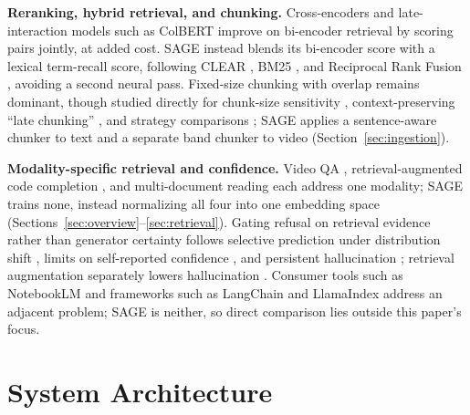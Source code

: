 \documentclass[conference]{IEEEtran}
\begin{document}
\textbf{Reranking, hybrid retrieval, and chunking.} Cross-encoders \cite{nogueira2019bert} and late-interaction models such as ColBERT \cite{khattab2020colbert} improve on bi-encoder retrieval by scoring pairs jointly, at added cost. SAGE instead blends its bi-encoder score with a lexical term-recall score, following CLEAR \cite{gao2020clear}, BM25 \cite{robertson2009bm25}, and Reciprocal Rank Fusion \cite{cormack2009rrf}, avoiding a second neural pass. Fixed-size chunking with overlap remains dominant, though studied directly for chunk-size sensitivity \cite{jimenoyepes2024chunking}, context-preserving ``late chunking'' \cite{gunther2024latechunking}, and strategy comparisons \cite{merola2025chunking}; SAGE applies a sentence-aware chunker to text and a separate band chunker to video (Section~\ref{sec:ingestion}).

\textbf{Modality-specific retrieval and confidence.} Video QA \cite{lei2018tvqa,zhang2024llovi}, retrieval-augmented code completion \cite{husain2019codesearchnet,zhang2023repocoder,wu2024repoformer}, and multi-document reading \cite{sachan2021multidoc} each address one modality; SAGE trains none, instead normalizing all four into one embedding space (Sections~\ref{sec:overview}--\ref{sec:retrieval}). Gating refusal on retrieval evidence rather than generator certainty follows selective prediction under distribution shift \cite{kamath2020selective}, limits on self-reported confidence \cite{kadavath2022knowwhattheyknow}, and persistent hallucination \cite{ji2023hallucination}; retrieval augmentation separately lowers hallucination \cite{shuster2021retrieval}. Consumer tools such as NotebookLM \cite{notebooklm2023} and frameworks such as LangChain \cite{langchain} and LlamaIndex \cite{llamaindex} address an adjacent problem; SAGE is neither, so direct comparison lies outside this paper's focus.

\section{System Architecture}
\label{sec:architecture}
\end{document}
